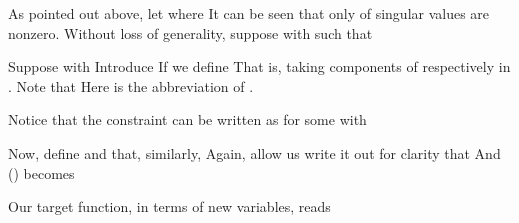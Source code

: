 As pointed out above, let
where
It can be seen that only  of  singular values are nonzero.
Without loss of generality, suppose
with
such that

Suppose
with
\Disp {
\NC -\gp
\preceq \NC 0 \NR
\NC -\gm
\preceq \NC 0 \NR
}
Introduce
If we define
\Disp {
\NC \fp
= \NC \fpU + \fpV \NR
\NC \fm
= \NC \fmU + \fmV \NR
}
That is, taking components of \m {\fp, \fm} respectively in .
Note that
\Disp {
\NC \fpU
= \NC \QU ^\Tr \gp \NR
\NC \fmU
= \NC \QU ^\Tr \gm \NR
\NC \fpV
= \NC \QV ^\Tr \gp \NR
\NC \fmV
= \NC \QV ^\Tr \gm \NR
}
Here \m {\QU ^\Tr} is the abbreviation of \m {\RB {\QU} ^\Tr}.

Notice that the constraint
can be written as
for some \m {\tp, \tm} with
\Disp {
\NC -\tp
\preceq \NC 0 \NR
\NC -\tm
\preceq \NC 0 \NR
}

Now, define
and that, similarly,
\Disp {
\NC \kp
=\NC \kpU + \kpV \NR
\NC \km
=\NC \kmU + \kmV \NR
}
Again, allow us write it out for clarity that
And () becomes
\Disp {
\NC \DU \RB {\fpU - \fmU} + \QU ^\Tr \tp - \kpU
=\NC 0 \NR
%
\NC \DU \RB {\fpU - \fmU} + \QU ^\Tr \tm - \kmU
=\NC 0 \NR
%
\NC \QV ^\Tr \tp - \kpV
=\NC 0 \NR
%
\NC \QV ^\Tr \tm - \kmV
=\NC 0 \NR
}

Our target function, in terms of new variables, reads

